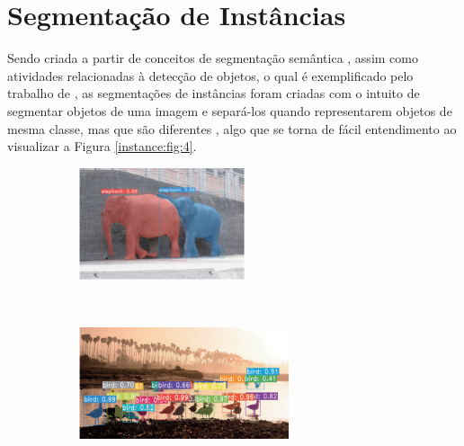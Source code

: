 \newpage
\clearpage
\section{Segmentação de Instâncias}
\label{instance:instance}

Sendo criada a partir de conceitos de segmentação semântica \cite{Minaee2021}, assim como atividades relacionadas à detecção de objetos, o qual é exemplificado pelo trabalho de \cite{Vaillant1994}, as segmentações de instâncias foram criadas com o intuito de segmentar objetos de uma imagem e separá-los quando representarem objetos de mesma classe, mas que são diferentes \cite{Hafiz2020}, algo que se torna de fácil entendimento ao visualizar a Figura \ref{instance:fig:4}.

\begin{figure}[H]
   \caption{Exemplos de segmentação de instâncias.}
   \centering
   \label{instance:fig:4}
    \begin{subfigure}[t]{0.45\textwidth}
        \centering
        \includegraphics[height=1.3in]{recursos/imagens/instance/ins1.png}
        \label{instance:fig:4.1}
    \end{subfigure}%
    ~ 
    \begin{subfigure}[t]{0.45\textwidth}
        \centering
        \includegraphics[height=1.3in]{recursos/imagens/instance/ins3.png}
        \label{instance:fig:4.2}
    \end{subfigure}%
    ~ 
    

\end{figure}

